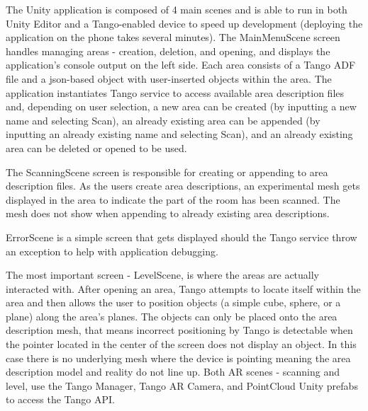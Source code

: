\documentclass[12pt, a4paper]{article}
\begin{document}
The Unity application is composed of 4 main scenes and is able to run in both Unity Editor and a Tango-enabled device to speed up development (deploying the application on the phone takes several minutes). The MainMenuScene screen handles managing areas - creation, deletion, and opening, and displays the application’s console output on the left side. Each area consists of a Tango ADF file and a json-based object with user-inserted objects within the area. The application instantiates Tango service to access available area description files and, depending on user selection, a new area can be created (by inputting a new name and selecting Scan), an already existing area can be appended (by inputting an already existing name and selecting Scan), and an already existing area can be deleted or opened to be used.

The ScanningScene screen is responsible for creating or appending to area description files. As the users create area descriptions, an experimental mesh gets displayed in the area to indicate the part of the room has been scanned. The mesh does not show when appending to already existing area descriptions.


ErrorScene is a simple screen that gets displayed should the Tango service throw an exception to help with application debugging.

The most important screen - LevelScene, is where the areas are actually interacted with. After opening an area, Tango attempts to locate itself within the area and then allows the user to position objects (a simple cube, sphere, or a plane) along the area’s planes. The objects can only be placed onto the area description mesh, that means incorrect positioning by Tango is detectable when the pointer located in the center of the screen does not display an object. In this case there is no underlying mesh where the device is pointing meaning the area description model and reality do not line up. Both AR scenes - scanning and level, use the Tango Manager, Tango AR Camera, and PointCloud Unity prefabs to access the Tango API.


\end{document}
